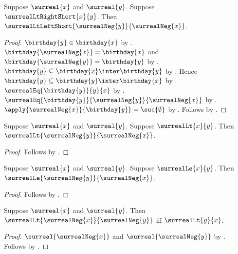 \begin{lemma}\label{surreal_negation_lt_right_short}
    Suppose $\surreal{x}$ and $\surreal{y}$.
    Suppose $\surrealLtRightShort{x}{y}$.
    Then $\surrealLtLeftShort{\surrealNeg{y}}{\surrealNeg{x}}$.
\end{lemma}
\begin{proof}
    $\birthday{y}\in\birthday{x}$
        by .
    $\birthday{\surrealNeg{x}}=\birthday{x}$ and
        $\birthday{\surrealNeg{y}}=\birthday{y}$
        by .
    $\birthday{y}\subseteq\birthday{x}\inter\birthday{y}$
        by .
    Hence $\birthday{y}\subseteq\birthday{y}\inter\birthday{x}$
        by .
    $\surrealEq{\birthday{y}}{y}{x}$
        by .
    $\surrealEq{\birthday{y}}{\surrealNeg{y}}{\surrealNeg{x}}$
        by .
    $\apply{\surrealNeg{x}}{\birthday{y}}=\suc{\emptyset}$
        by .
    Follows by .
\end{proof}

\begin{theorem}\label{surreal_negation_lt_reverses}
    Suppose $\surreal{x}$ and $\surreal{y}$.
    Suppose $\surrealLt{x}{y}$.
    Then $\surrealLt{\surrealNeg{y}}{\surrealNeg{x}}$.
\end{theorem}
\begin{proof}
    Follows by .
\end{proof}

\begin{corollary}\label{surreal_negation_le_reverses}
    Suppose $\surreal{x}$ and $\surreal{y}$.
    Suppose $\surrealLe{x}{y}$.
    Then $\surrealLe{\surrealNeg{y}}{\surrealNeg{x}}$.
\end{corollary}
\begin{proof}
    Follows by .
\end{proof}

\begin{corollary}\label{surreal_negation_lt_iff}
    Suppose $\surreal{x}$ and $\surreal{y}$.
    Then $\surrealLt{\surrealNeg{x}}{\surrealNeg{y}}$ iff
        $\surrealLt{y}{x}$.
\end{corollary}
\begin{proof}
    $\surreal{\surrealNeg{x}}$ and $\surreal{\surrealNeg{y}}$
        by .
    Follows by .
\end{proof}

